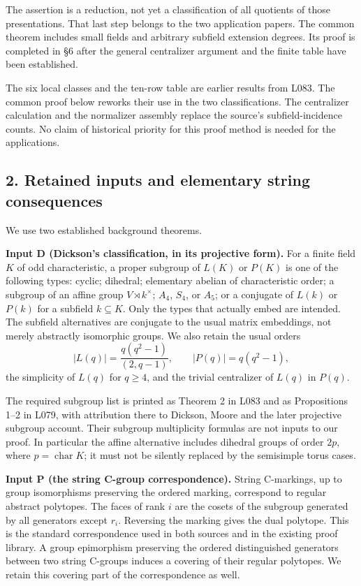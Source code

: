 \documentclass[
  11pt,
  a4paper,
]{article}
\begin{document}
The assertion is a reduction, not yet a classification of all quotients
of those presentations. That last step belongs to the two application
papers. The common theorem includes small fields and arbitrary subfield
extension degrees. Its proof is completed in §6 after the general
centralizer argument and the finite table have been established.

The six local classes and the ten-row table are earlier results from
L083. The common proof below reworks their use in the two
classifications. The centralizer calculation and the normalizer assembly
replace the source's subfield-incidence counts. No claim of historical
priority for this proof method is needed for the applications.

\subsection{2. Retained inputs and elementary string
consequences}\label{retained-inputs-and-elementary-string-consequences}

We use two established background theorems.

\textbf{Input D (Dickson's classification, in its projective form).} For
a finite field \(K\) of odd characteristic, a proper subgroup of
\(L(K)\) or \(P(K)\) is one of the following types: cyclic; dihedral;
elementary abelian of characteristic order; a subgroup of an affine
group \(V\rtimes k^\times\); \(A_4\), \(S_4\), or \(A_5\); or a
conjugate of \(L(k)\) or \(P(k)\) for a subfield \(k\subseteq K\). Only
the types that actually embed are intended. The subfield alternatives
are conjugate to the usual matrix embeddings, not merely abstractly
isomorphic groups. We also retain the usual orders \[
 |L(q)|=\frac{q(q^2-1)}{(2,q-1)},\qquad |P(q)|=q(q^2-1),
 \tag{2}
\] the simplicity of \(L(q)\) for \(q\ge4\), and the trivial centralizer
of \(L(q)\) in \(P(q)\).

The required subgroup list is printed as Theorem 2 in L083 and as
Propositions 1--2 in L079, with attribution there to Dickson, Moore and
the later projective subgroup account. Their subgroup multiplicity
formulas are not inputs to our proof. In particular the affine
alternative includes dihedral groups of order \(2p\), where
\(p=\operatorname{char}K\); it must not be silently replaced by the
semisimple torus cases.

\textbf{Input P (the string C-group correspondence).} String C-markings,
up to group isomorphisms preserving the ordered marking, correspond to
regular abstract polytopes. The faces of rank \(i\) are the cosets of
the subgroup generated by all generators except \(r_i\). Reversing the
marking gives the dual polytope. This is the standard correspondence
used in both sources and in the existing proof library. A group
epimorphism preserving the ordered distinguished generators between two
string C-groups induces a covering of their regular polytopes. We retain
this covering part of the correspondence as well.
\end{document}
